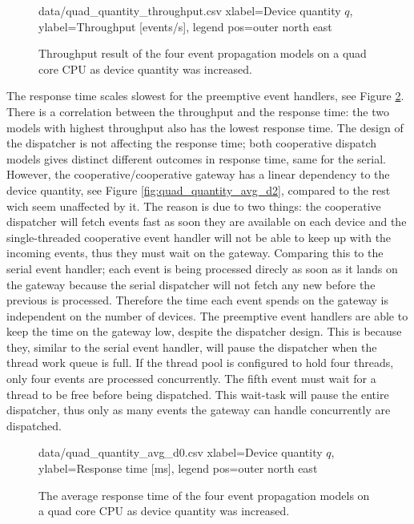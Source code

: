 \begin{figure}[h!]
    \centering
    \performanceplot
    {data/quad_quantity_throughput.csv}
    {
        xlabel=Device quantity $q$,
        ylabel={Throughput [events/s]},
        legend pos=outer north east
    }
    \caption{Throughput result of the four event propagation models on a quad
    core CPU as device quantity was increased.}
    \label{fig:quad_quantity_throughput}
\end{figure}

The response time scales slowest for the preemptive event handlers, see Figure
\ref{fig:quad_quantity_avg_d0}. There is a correlation between the throughput
and the response time: the two models with highest throughput also has the
lowest response time. The design of the dispatcher is not affecting the
response time; both cooperative dispatch models gives distinct different
outcomes in response time, same for the serial. However, the
cooperative/cooperative gateway has a linear dependency to the device quantity,
see Figure \ref{fig:quad_quantity_avg_d2}, compared to the rest wich seem
unaffected by it. The reason is due to two things: the cooperative dispatcher
will fetch events fast as soon they are available on each device and the
single-threaded cooperative event handler will not be able to keep up with the
incoming events, thus they must wait on the gateway. Comparing this to the
serial event handler; each event is being processed direcly as soon as it lands
on the gateway because the serial dispatcher will not fetch any new before the
previous is processed. Therefore the time each event spends on the gateway is
independent on the number of devices. The preemptive event handlers are able to
keep the time on the gateway low, despite the dispatcher design. This is
because they, similar to the serial event handler, will pause the dispatcher
when the thread work queue is full. If the thread pool is configured to hold
four threads, only four events are processed concurrently. The fifth event must
wait for a thread to be free before being dispatched. This wait-task will pause
the entire dispatcher, thus only as many events the gateway can handle
concurrently are dispatched.

\begin{figure}[h!]
    \centering
    \performanceplot
    {data/quad_quantity_avg_d0.csv}
    {
        xlabel=Device quantity $q$,
        ylabel={Response time [ms]},
        legend pos=outer north east
    }
    \caption{The average response time of the four event propagation models on
    a quad core CPU as device quantity was increased.}
    \label{fig:quad_quantity_avg_d0}
\end{figure}

